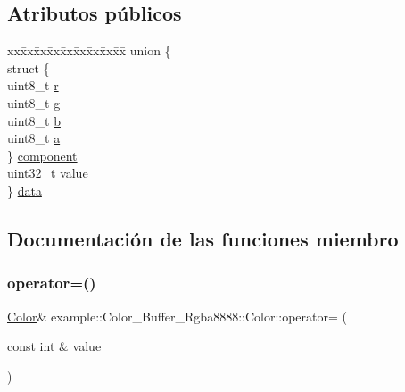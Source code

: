 \subsection*{Atributos públicos}
\begin{DoxyCompactItemize}
\item 
\begin{tabbing}
xx\=xx\=xx\=xx\=xx\=xx\=xx\=xx\=xx\=\kill
union \{\\
\>struct \{\\
\>\>uint8\_t \mbox{\hyperlink{structexample_1_1_color___buffer___rgba8888_1_1_color_a3ae8419af50bed867580b5ca28b9e254}{r}}\\
\>\>uint8\_t \mbox{\hyperlink{structexample_1_1_color___buffer___rgba8888_1_1_color_a02b8df3c9800b6d9efab7872ead00da1}{g}}\\
\>\>uint8\_t \mbox{\hyperlink{structexample_1_1_color___buffer___rgba8888_1_1_color_a9213fba01a28ef7dbe871fe2669a0226}{b}}\\
\>\>uint8\_t \mbox{\hyperlink{structexample_1_1_color___buffer___rgba8888_1_1_color_ac93fe62cb2f57a798639f74a547293be}{a}}\\
\>\} \mbox{\hyperlink{structexample_1_1_color___buffer___rgba8888_1_1_color_ac96a7902c0c3c9057d7b7305583998c1}{component}}\\
\>uint32\_t \mbox{\hyperlink{structexample_1_1_color___buffer___rgba8888_1_1_color_aa8c3f5e3038dd7743aab9592023418e4}{value}}\\
\} \mbox{\hyperlink{structexample_1_1_color___buffer___rgba8888_1_1_color_ad72a4b9a37e96fe39fd68d22459e0239}{data}}\\

\end{tabbing}\end{DoxyCompactItemize}


\subsection{Documentación de las funciones miembro}
\mbox{\label{structexample_1_1_color___buffer___rgba8888_1_1_color_ada91a7b49ff32dc823e5cf733fc94b55}} 
\subsubsection{\texorpdfstring{operator=()}{operator=()}}
{\footnotesize\ttfamily \mbox{\hyperlink{structexample_1_1_color___buffer___rgba8888_1_1_color}{Color}}\& example\+::\+Color\+\_\+\+Buffer\+\_\+\+Rgba8888\+::\+Color\+::operator= (\begin{DoxyParamCaption}\item[{const int \&}]{value }\end{DoxyParamCaption})\hspace{0.3cm}{\ttfamily [inline]}}

